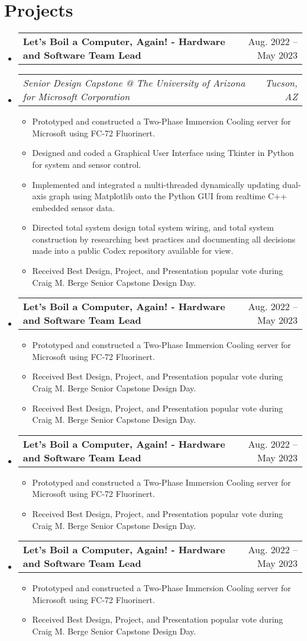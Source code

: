 \documentclass[letterpaper,11pt]{article}
\makeatletter
\newcommand{\resumeItem}[1]{
  \item\small{
    {#1 \vspace{-2pt}}
  }
}
\newcommand{\resumeSubSubheading}[2]{
    \item
    \begin{tabular*}{0.97\textwidth}{l@{\extracolsep{\fill}}r}
      \textit{\small#1} & \textit{\small #2} \\
    \end{tabular*}\vspace{-7pt}
}
\newcommand{\resumeProjectHeading}[2]{
    \item
    \begin{tabular*}{0.97\textwidth}{l@{\extracolsep{\fill}}r}
      \small#1 & #2 \\
    \end{tabular*}\vspace{-7pt}
}
\newcommand{\resumeSubHeadingListStart}{\begin{itemize}[leftmargin=0.15in, label={}]}
\newcommand{\resumeSubHeadingListEnd}{\end{itemize}}
\newcommand{\resumeItemListStart}{\begin{itemize}}
\newcommand{\resumeItemListEnd}{\end{itemize}\vspace{-5pt}}
\makeatother
\begin{document}
\section{Projects}
    \resumeSubHeadingListStart
      \resumeProjectHeading
          {\textbf{Let's Boil a Computer, Again! - Hardware and Software Team Lead} }{Aug. 2022 -- May 2023}
          \resumeSubSubheading{Senior Design Capstone @ The University of Arizona for Microsoft Corporation}{Tucson, AZ}
          \resumeItemListStart
            \resumeItem{Prototyped and constructed a Two-Phase Immersion Cooling server for Microsoft using FC-72 Fluorinert.}
            \resumeItem{Designed and coded a Graphical User Interface using Tkinter in Python for system and sensor control.}
            \resumeItem{Implemented and integrated a multi-threaded dynamically updating dual-axis graph using Matplotlib onto the Python GUI from realtime C++ embedded sensor data.}
            \resumeItem{Directed total system design total system wiring, and total system construction by researching best practices and documenting all decisions made into a public Codex repository available for view.}
            \resumeItem{Received Best Design, Project, and Presentation popular vote during Craig M. Berge Senior Capstone Design Day.}
          \resumeItemListEnd
      \resumeProjectHeading
          {\textbf{Let's Boil a Computer, Again! - Hardware and Software Team Lead} }{Aug. 2022 -- May 2023}{}
          \resumeItemListStart
            \resumeItem{Prototyped and constructed a Two-Phase Immersion Cooling server for Microsoft using FC-72 Fluorinert.}
            \resumeItem{Received Best Design, Project, and Presentation popular vote during Craig M. Berge Senior Capstone Design Day.}
            \resumeItem{Received Best Design, Project, and Presentation popular vote during Craig M. Berge Senior Capstone Design Day.}
          \resumeItemListEnd
      \resumeProjectHeading
          {\textbf{Let's Boil a Computer, Again! - Hardware and Software Team Lead} }{Aug. 2022 -- May 2023}{}
          \resumeItemListStart
            \resumeItem{Prototyped and constructed a Two-Phase Immersion Cooling server for Microsoft using FC-72 Fluorinert.}
            \resumeItem{Received Best Design, Project, and Presentation popular vote during Craig M. Berge Senior Capstone Design Day.}
          \resumeItemListEnd
      \resumeProjectHeading
          {\textbf{Let's Boil a Computer, Again! - Hardware and Software Team Lead} }{Aug. 2022 -- May 2023}{}
          \resumeItemListStart
            \resumeItem{Prototyped and constructed a Two-Phase Immersion Cooling server for Microsoft using FC-72 Fluorinert.}
            \resumeItem{Received Best Design, Project, and Presentation popular vote during Craig M. Berge Senior Capstone Design Day.}
          \resumeItemListEnd
    \resumeSubHeadingListEnd
\end{document}
